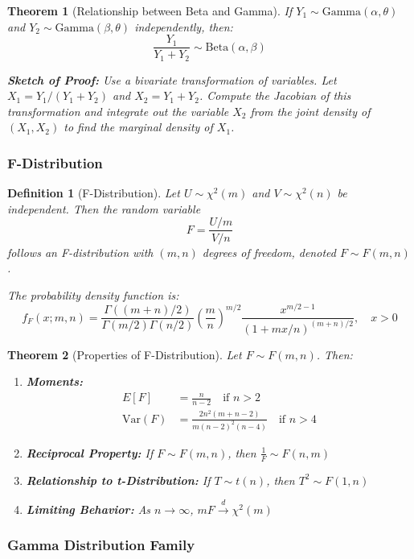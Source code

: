 \documentclass[12pt,a4paper]{article}
\newtheorem{theorem}{Theorem}[section]
\newtheorem{definition}{Definition}[section]
\theoremstyle{remark}
\begin{document}
\begin{theorem}[Relationship between Beta and Gamma]
If $Y_1 \sim \text{Gamma}(\alpha, \theta)$ and $Y_2 \sim \text{Gamma}(\beta, \theta)$ independently, then:
$$\frac{Y_1}{Y_1 + Y_2} \sim \text{Beta}(\alpha, \beta)$$

\textbf{Sketch of Proof:} Use a bivariate transformation of variables. Let $X_1 = Y_1 / (Y_1 + Y_2)$ and $X_2 = Y_1 + Y_2$. Compute the Jacobian of this transformation and integrate out the variable $X_2$ from the joint density of $(X_1, X_2)$ to find the marginal density of $X_1$.
\end{theorem}

\subsubsection{F-Distribution}

\begin{definition}[F-Distribution]
Let $U \sim \chi^2(m)$ and $V \sim \chi^2(n)$ be independent. Then the random variable
$$F = \frac{U/m}{V/n}$$
follows an F-distribution with $(m,n)$ degrees of freedom, denoted $F \sim F(m,n)$.

The probability density function is:
$$f_F(x; m,n) = \frac{\Gamma((m+n)/2)}{\Gamma(m/2)\Gamma(n/2)} \left(\frac{m}{n}\right)^{m/2} \frac{x^{m/2-1}}{(1 + mx/n)^{(m+n)/2}}, \quad x > 0$$
\end{definition}

\begin{theorem}[Properties of F-Distribution]
Let $F \sim F(m,n)$. Then:
\begin{enumerate}
\item \textbf{Moments:}
   \begin{align}
   E[F] &= \frac{n}{n-2} \quad \text{if } n > 2\\
   \text{Var}(F) &= \frac{2n^2(m+n-2)}{m(n-2)^2(n-4)} \quad \text{if } n > 4
   \end{align}
\item \textbf{Reciprocal Property:} If $F \sim F(m,n)$, then $\frac{1}{F} \sim F(n,m)$
\item \textbf{Relationship to t-Distribution:} If $T \sim t(n)$, then $T^2 \sim F(1,n)$
\item \textbf{Limiting Behavior:} As $n \to \infty$, $mF \stackrel{d}{\to} \chi^2(m)$
\end{enumerate}
\end{theorem}

\subsubsection{Gamma Distribution Family}
\end{document}
